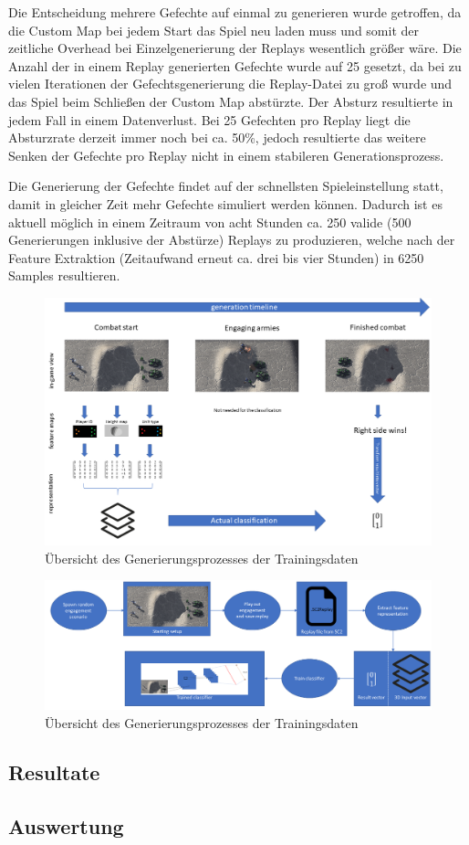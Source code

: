 Die Entscheidung mehrere Gefechte auf einmal zu generieren wurde getroffen, da die Custom Map bei jedem Start das Spiel neu laden muss und somit der zeitliche Overhead bei Einzelgenerierung der Replays wesentlich größer wäre. Die Anzahl der in einem Replay generierten Gefechte wurde auf 25 gesetzt, da bei zu vielen Iterationen der Gefechtsgenerierung die Replay-Datei zu groß wurde und das Spiel beim Schließen der Custom Map abstürzte. Der Absturz resultierte in jedem Fall in einem Datenverlust. Bei 25 Gefechten pro Replay liegt die Absturzrate derzeit immer noch bei ca. 50\%, jedoch resultierte das weitere Senken der Gefechte pro Replay nicht in einem stabileren Generationsprozess. 

Die Generierung der Gefechte findet auf der schnellsten Spieleinstellung statt, damit in gleicher Zeit mehr Gefechte simuliert werden können. Dadurch ist es aktuell möglich in einem Zeitraum von acht Stunden ca. 250 valide (500 Generierungen inklusive der Abstürze) Replays zu produzieren, welche nach der Feature Extraktion (Zeitaufwand erneut ca. drei bis vier Stunden) in 6250 Samples resultieren. 

\begin{figure}[H]
\thispagestyle{empty}
\centering
\includegraphics[angle=90,scale=0.75]{pictures/grafiken/Folie1}
\caption{Übersicht des Generierungsprozesses der Trainingsdaten}
\label{fig:overview2}
\end{figure}

\begin{figure}[H]
\thispagestyle{empty}
\centering
\includegraphics[angle=90,scale=0.75]{pictures/grafiken/Folie2}
\caption{Übersicht des Generierungsprozesses der Trainingsdaten}
\label{fig:overview1}
\end{figure}


\subsection{Resultate}
\label{Resultate}

\subsection{Auswertung}
\label{Auswertung}